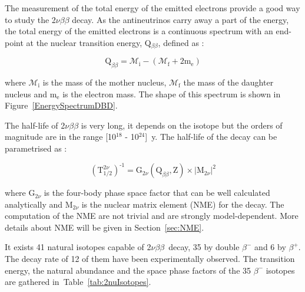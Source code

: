 \documentclass[main.tex]{subfiles}
\begin{document}
\bigskip


\NI The measurement of the total energy of the emitted electrons provide a good way to study the 2$\nu\beta\beta$ decay. As the antineutrinos carry away a part of the energy, the total energy of the emitted electrons is a continuous spectrum with an end-point at the nuclear transition energy, Q$_{\beta\beta}$, defined as :


\begin{equation}
\text{Q}_{\beta\beta} = \mathcal{M}_\text{i} - (\mathcal{M}_\text{f} + \text{2m}_\text{e})
\end{equation}


\bigskip


\NI where $\mathcal{M}_\text{i}$ is the mass of the mother nucleus, $\mathcal{M}_\text{f}$ the mass of the daughter nucleus and m$_\text{e}$ is the electron mass. The shape of this spectrum is shown in Figure~\ref{EnergySpectrumDBD}.


\bigskip


\NI The half-life of 2$\nu\beta\beta$ is very long, it depends on the isotope but the orders of magnitude are in the range [10$^{\text{18}}$ - 10$^{\text{24}}$]~y.  The half-life of the decay can be parametrised as : 


\begin{equation}\label{eq:decayRate2nu}
(\text{T}_{\text{1/2}}^{\text{2}\nu})^{\text{-1}} = \text{G}_{\text{2}\nu}(\text{Q}_{\beta\beta}, \text{Z}) \times |\text{M}_{\text{2}\nu}|^\text{2}
\end{equation}


\bigskip


\NI where G$_{\text{2}\nu}$ is the four-body phase space factor that can be well calculated analytically and M$_{\text{2}\nu}$ is the nuclear matrix element (NME) for the decay. The computation of the NME are not trivial and are strongly model-dependent. More details about NME will be given in Section~\ref{sec:NME}.


\bigskip


\NI It exists 41 natural isotopes capable of 2$\nu\beta\beta$~decay, 35 by double $\beta^{-}$ and 6 by $\beta^{+}$. The decay rate of 12 of them have been experimentally observed. The transition energy, the natural abundance and the space phase factors of the 35 $\beta^{-}$ isotopes are gathered in~Table~\ref{tab:2nuIsotopes}.
\end{document}

